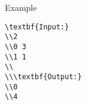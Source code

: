 Example  
\begin{verbatim}
\textbf{Input:}
\\2
\\0 3
\\1 1
\\
\\\textbf{Output:}
\\0
\\4\end{verbatim}